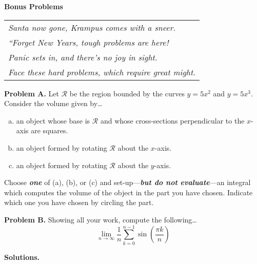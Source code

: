 \documentclass[11pt,letterpaper]{article}
\begin{document}

\phantom{.} \hfill {\LARGE \bfseries Bonus Problems} \hfill \phantom{.} 

	\begin{table}[h]
	\centering
	\begin{tabular}{l}
	{\itshape Santa now gone, Krampus comes with a sneer.} \\
	{\itshape ``Forget New Years, tough problems are here!} \\
	{\itshape Panic sets in, and there's no joy in sight.} \\
	{\itshape Face these hard problems, which require great might.}
	\end{tabular}
	\end{table} \par\vspace{0.3cm}

\textbf{Problem A.} Let $\mathcal{R}$ be the region bounded by the curves $y= 5x^2$ and $y= 5x^3$. Consider the volume given by\dots
	\begin{enumerate}[(a)]
	\item an object whose base is $\mathcal{R}$ and whose cross-sections perpendicular to the $x$-axis are squares. 
	\item an object formed by rotating $\mathcal{R}$ about the $x$-axis.
	\item an object formed by rotating $\mathcal{R}$ about the $y$-axis.
	\end{enumerate}
Choose \textit{\textbf{one}} of (a), (b), or (c) and set-up---\textit{\bfseries but do not evaluate}---an integral which computes the volume of the object in the part you have chosen. Indicate which one you have chosen by circling the part. \par\vspace{1cm}

\textbf{Problem B.} Showing all your work, compute the following\dots
	\[
	\lim_{n \to \infty} \dfrac{1}{n} \sum_{k=0}^{n-1} \sin \left( \frac{\pi k}{n} \right)
	\] \pspace

{\bfseries Solutions.} \pspace
\end{document}

